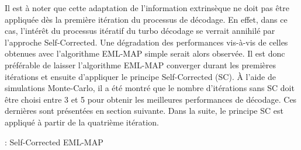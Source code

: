 Il est à noter que cette adaptation de l'information extrinsèque ne doit pas être appliquée dès la première itération 
du processus de décodage. En effet, dans ce cas, l’intérêt du processus itératif du turbo décodage se verrait annihilé par l'approche Self-Corrected.
Une dégradation des performances vis-à-vis de celles obtenues avec l'algorithme EML-MAP simple serait alors observée.
Il est donc préférable de laisser l'algorithme EML-MAP converger durant les premières itérations et ensuite d'appliquer le principe 
Self-Corrected (SC). À l'aide de simulations Monte-Carlo, il a été montré que le nombre d'itérations sans SC doit être 
choisi entre 3 et 5 pour obtenir les meilleures performances de décodage. Ces dernières sont présentées en section suivante.
Dans la suite, le principe SC est appliqué à partir de la quatrième itération.

\begin{center}
\begin{minipage}{.6\textwidth}%
	\begin{algorithm}[H]
		\DontPrintSemicolon
		
		{
			\DA\;
			{
			}
			\DB\;
			{
			}
		}
	\caption{: Self-Corrected EML-MAP}
	\label{alg:sc1}
	\end{algorithm}
\end{minipage}
\end{center}

